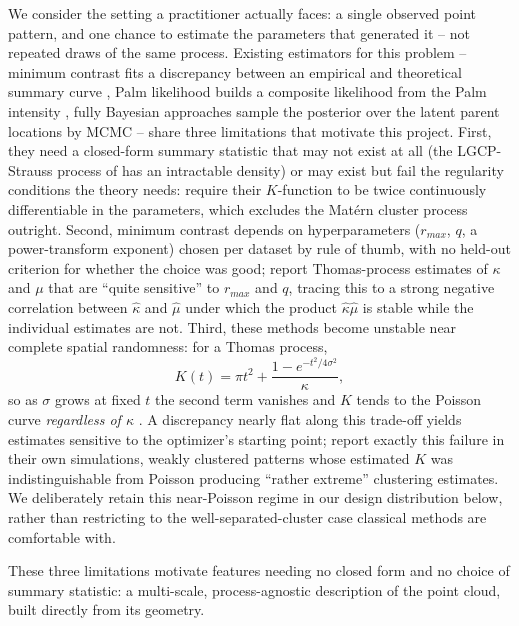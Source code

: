 \documentclass[11pt,a4paper]{article}
\theoremstyle{definitioncolon}
\begin{document}
We consider the setting a practitioner actually faces: a single observed
point pattern, and one chance to estimate the parameters that generated it --
not repeated draws of the same process. Existing estimators for this
problem -- minimum contrast fits a discrepancy between an empirical and
theoretical summary curve \citep{diggle2003spatial}, Palm likelihood builds
a composite likelihood from the Palm intensity \citep{tanaka2008parameter},
fully Bayesian approaches sample the posterior over the latent parent
locations by MCMC \citep{moller2004statistical} -- share three limitations
that motivate this project. First, they need a closed-form summary
statistic that may not exist at all (the LGCP-Strauss process of
\citet{vihrs2022neural} has an intractable density) or may exist but fail
the regularity conditions the theory needs: \citet{waagepetersen2009twostep}
require their $K$-function to be twice continuously differentiable in the
parameters, which excludes the Mat\'ern cluster process outright. Second,
minimum contrast depends on hyperparameters ($r_{max}$, $q$, a
power-transform exponent) chosen per dataset by rule of thumb, with no
held-out criterion for whether the choice was good; \citet{waagepetersen2009twostep}
report Thomas-process estimates of $\kappa$ and $\mu$ that are ``quite
sensitive'' to $r_{max}$ and $q$, tracing this to a strong negative
correlation between $\hat\kappa$ and $\hat\mu$ under which the product
$\hat\kappa\hat\mu$ is stable while the individual estimates are not. Third,
these methods become unstable near complete spatial randomness: for a
Thomas process,
\begin{equation}
\label{paramnet:eq-kdegen}
K(t) = \pi t^2 + \frac{1-e^{-t^2/4\sigma^2}}{\kappa},
\end{equation}
so as $\sigma$ grows at fixed $t$ the second term vanishes and $K$ tends to
the Poisson curve \emph{regardless of $\kappa$} \citep{waagepetersen2009twostep}.
A discrepancy nearly flat along this trade-off yields estimates sensitive to
the optimizer's starting point; \citet{waagepetersen2009twostep} report
exactly this failure in their own simulations, weakly clustered patterns
whose estimated $K$ was indistinguishable from Poisson producing ``rather
extreme'' clustering estimates. We deliberately retain this near-Poisson
regime in our design distribution below, rather than restricting to the
well-separated-cluster case classical methods are comfortable with.

These three limitations motivate features needing no closed form and no
choice of summary statistic: a multi-scale, process-agnostic description of
the point cloud, built directly from its geometry.
\end{document}
